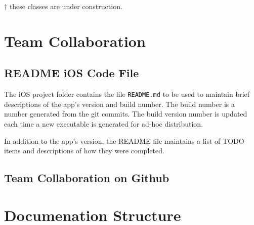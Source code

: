 \noindent \textbf{$\dagger$} these classes are under construction.


\section{Team Collaboration}
\subsection{README iOS Code File}
The iOS project folder contains the file \texttt{README.md} to be used to maintain brief
descriptions of the app's version and build number.  The build number is a number 
generated from the git commits. The build version number is updated each time a new 
executable is generated for ad-hoc distribution.

In addition to the app's version, the README file maintains a list of TODO items and 
descriptions of how they were completed.


\subsection{Team Collaboration on Github}
\href{https://help.github.com/articles/resolving-merge-conflicts}{\color{blue}{Resolving merge conflicts}}
\section{Documenation Structure}





